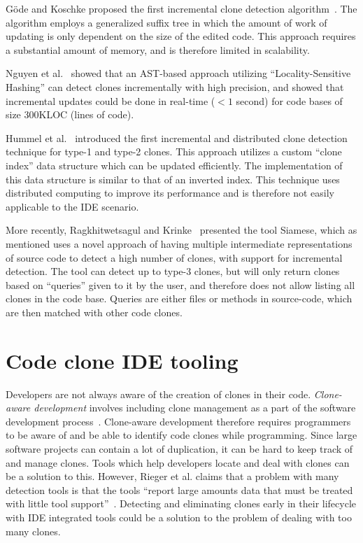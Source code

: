 Göde and Koschke proposed the first incremental clone detection
algorithm~\cite{GodeIncrementalCloneDetection}. The algorithm employs a generalized suffix
tree in which the amount of work of updating is only dependent on the size of the edited
code. This approach requires a substantial amount of memory, and is therefore limited in
scalability.

Nguyen et al.~\cite{LocalitySensitiveHashingIncremental} showed that an AST-based approach
utilizing ``Locality-Sensitive Hashing'' can detect clones incrementally with high
precision, and showed that incremental updates could be done in real-time ($< 1$ second)
for code bases of size 300KLOC (lines of code).

Hummel et al.~\cite{IndexBasedIncrementalCloneDetection} introduced the first incremental
and distributed clone detection technique for type-1 and type-2 clones. This approach
utilizes a custom ``clone index'' data structure which can be updated efficiently. The
implementation of this data structure is similar to that of an inverted index. This
technique uses distributed computing to improve its performance and is therefore not
easily applicable to the IDE scenario.

More recently, Ragkhitwetsagul and Krinke~\cite{SiameseScalableAndIncrementalClone}
presented the tool Siamese, which as mentioned uses a novel approach of having multiple
intermediate representations of source code to detect a high number of clones, with
support for incremental detection. The tool can detect up to type-3 clones, but will only
return clones based on ``queries'' given to it by the user, and therefore does not allow
listing all clones in the code base. Queries are either files or methods in source-code,
which are then matched with other code clones.

\section{Code clone IDE tooling}

Developers are not always aware of the creation of clones in their code. \emph{Clone-aware
development} involves including clone management as a part of the software development
process~\cite{Zibran_real_time_search}. Clone-aware development therefore requires
programmers to be aware of and be able to identify code clones while programming. Since
large software projects can contain a lot of duplication, it can be hard to keep track of
and manage clones. Tools which help developers locate and deal with clones can be a
solution to this. However, Rieger et al. claims that a problem with many detection tools
is that the tools ``report large amounts data that must be treated with little tool
support''~\cite[1]{InsightsSystemWideDuplication}. Detecting and eliminating clones early
in their lifecycle with IDE integrated tools could be a solution to the problem of dealing
with too many clones.

